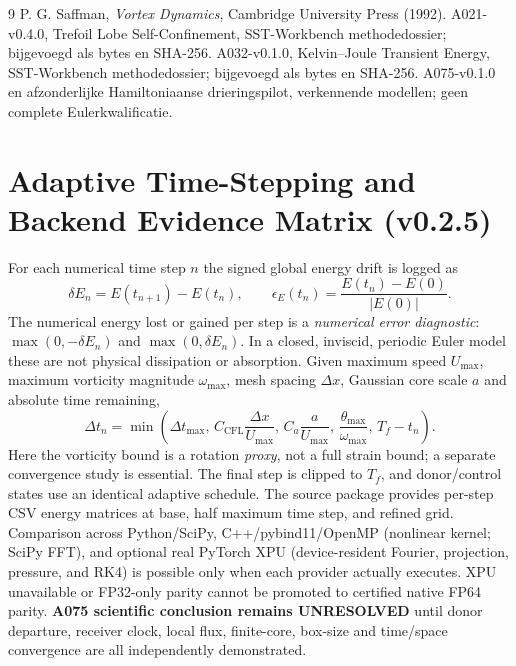 \documentclass[10pt,a4paper]{article}
\begin{document}
\begin{thebibliography}{9}
 P. G. Saffman, \emph{Vortex Dynamics}, Cambridge University Press (1992).
 A021-v0.4.0, Trefoil Lobe Self-Confinement, SST-Workbench methodedossier; bijgevoegd als bytes en SHA-256.
 A032-v0.1.0, Kelvin--Joule Transient Energy, SST-Workbench methodedossier; bijgevoegd als bytes en SHA-256.
 A075-v0.1.0 en afzonderlijke Hamiltoniaanse drieringspilot, verkennende modellen; geen complete Eulerkwalificatie.
\end{thebibliography}

\section{Adaptive Time-Stepping and Backend Evidence Matrix (v0.2.5)}
For each numerical time step $n$ the signed global energy drift is logged as
\begin{equation}
\delta E_n=E(t_{n+1})-E(t_n),\qquad
\epsilon_E(t_n)=\frac{E(t_n)-E(0)}{|E(0)|}.
\end{equation}
The numerical energy lost or gained per step is a \emph{numerical error diagnostic}:
$\max(0,-\delta E_n)$ and $\max(0,\delta E_n)$. In a closed, inviscid,
periodic Euler model these are not physical dissipation or absorption.
Given maximum speed $U_{\max}$, maximum vorticity magnitude $\omega_{\max}$,
mesh spacing $\Delta x$, Gaussian core scale $a$ and absolute time remaining,
\begin{equation}
\Delta t_n=\min\left(\Delta t_{\max},\,
C_{\mathrm{CFL}}\frac{\Delta x}{U_{\max}},\,
C_a\frac{a}{U_{\max}},\,
\frac{\theta_{\max}}{\omega_{\max}},\,T_f-t_n\right).
\end{equation}
Here the vorticity bound is a rotation \emph{proxy}, not a full strain bound;
a separate convergence study is essential. The final step is clipped to $T_f$,
and donor/control states use an identical adaptive schedule.
The source package provides per-step CSV energy matrices at base,
half maximum time step, and refined grid. Comparison across Python/SciPy,
C++/pybind11/OpenMP (nonlinear kernel; SciPy FFT), and optional real
PyTorch XPU (device-resident Fourier, projection, pressure, and RK4) is
possible only when each provider actually executes. XPU unavailable or
FP32-only parity cannot be promoted to certified native FP64 parity.
\textbf{A075 scientific conclusion remains UNRESOLVED} until donor departure,
receiver clock, local flux, finite-core, box-size and time/space convergence
are all independently demonstrated.
\end{document}
